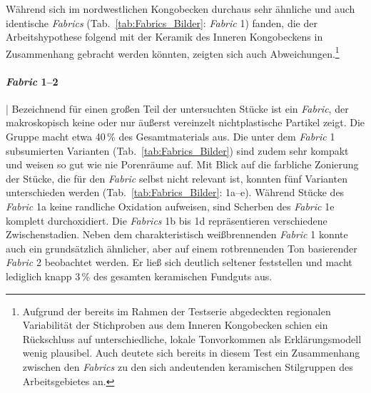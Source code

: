 \begin{multicols}{2}
\raggedcolumns
\noindent

Während sich im nordwestlichen Kongobecken durchaus sehr ähnliche und auch identische \textit{Fabrics} (Tab.~\ref{tab:Fabrics_Bilder}: \textit{Fabric} 1) fanden, die der Arbeitshypothese folgend mit der Keramik des Inneren Kongobeckens in Zusammenhang gebracht werden könnten, zeigten sich auch Abweichungen.\footnote{Aufgrund der bereits im Rahmen der Testserie abgedeckten regionalen Variabilität der Stichproben aus dem Inneren Kongobecken schien ein Rückschluss auf unterschiedliche, lokale Tonvorkommen als Erklärungsmodell wenig plausibel. Auch deutete sich bereits in diesem Test ein Zusammenhang zwischen den \textit{Fabrics} zu den sich andeutenden keramischen Stilgruppen des Arbeitsgebietes an.}

\paragraph{\textit{Fabric} 1--2}\hspace{-.5em}|\hspace{.5em}%
Bezeichnend für einen großen Teil der untersuchten Stücke ist ein \textit{Fabric}, der makroskopisch keine oder nur äußerst vereinzelt nichtplastische Partikel zeigt. Die Gruppe macht etwa 40\,\% des Gesamtmaterials aus. Die unter dem \textit{Fabric} 1 subsumierten Varianten (Tab.~\ref{tab:Fabrics_Bilder}) sind zudem sehr kompakt und weisen so gut wie nie Porenräume auf. Mit Blick auf die farbliche Zonierung der Stücke, die für den \textit{Fabric} selbst nicht relevant ist, konnten fünf Varianten unterschieden werden (Tab.~\ref{tab:Fabrics_Bilder}: 1a--e). Während Stücke des \textit{Fabric} 1a keine randliche Oxidation aufweisen, sind Scherben des \textit{Fabric} 1e komplett durchoxidiert. Die \textit{Fabrics} 1b bis 1d repräsentieren verschiedene Zwischenstadien. Neben dem charakteristisch weißbrennenden \textit{Fabric} 1 konnte auch ein grundsätzlich ähnlicher, aber auf einem rotbrennenden Ton basierender \textit{Fabric} 2 beobachtet werden. Er ließ sich deutlich seltener feststellen und macht lediglich knapp 3\,\% des gesamten keramischen Fundguts aus.


\end{multicols}
